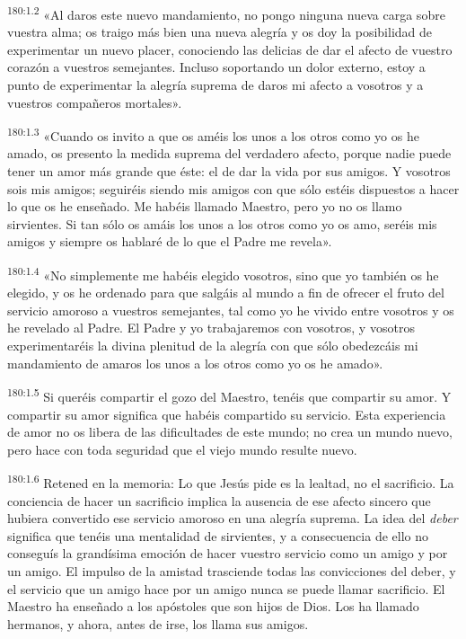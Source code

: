 \par 
\textsuperscript{180:1.2} «Al daros este nuevo mandamiento, no pongo ninguna nueva carga sobre vuestra alma; os traigo más bien una nueva alegría y os doy la posibilidad de experimentar un nuevo placer, conociendo las delicias de dar el afecto de vuestro corazón a vuestros semejantes. Incluso soportando un dolor externo, estoy a punto de experimentar la alegría suprema de daros mi afecto a vosotros y a vuestros compañeros mortales».

\par 
\textsuperscript{180:1.3} «Cuando os invito a que os améis los unos a los otros como yo os he amado, os presento la medida suprema del verdadero afecto, porque nadie puede tener un amor más grande que éste: el de dar la vida por sus amigos. Y vosotros sois mis amigos; seguiréis siendo mis amigos con que sólo estéis dispuestos a hacer lo que os he enseñado. Me habéis llamado Maestro, pero yo no os llamo sirvientes. Si tan sólo os amáis los unos a los otros como yo os amo, seréis mis amigos y siempre os hablaré de lo que el Padre me revela».

\par 
\textsuperscript{180:1.4} «No simplemente me habéis elegido vosotros, sino que yo también os he elegido, y os he ordenado para que salgáis al mundo a fin de ofrecer el fruto del servicio amoroso a vuestros semejantes, tal como yo he vivido entre vosotros y os he revelado al Padre. El Padre y yo trabajaremos con vosotros, y vosotros experimentaréis la divina plenitud de la alegría con que sólo obedezcáis mi mandamiento de amaros los unos a los otros como yo os he amado».

\par 
\textsuperscript{180:1.5} Si queréis compartir el gozo del Maestro, tenéis que compartir su amor. Y compartir su amor significa que habéis compartido su servicio. Esta experiencia de amor no os libera de las dificultades de este mundo; no crea un mundo nuevo, pero hace con toda seguridad que el viejo mundo resulte nuevo.

\par 
\textsuperscript{180:1.6} Retened en la memoria: Lo que Jesús pide es la lealtad, no el sacrificio. La conciencia de hacer un sacrificio implica la ausencia de ese afecto sincero que hubiera convertido ese servicio amoroso en una alegría suprema. La idea del \textit{deber} significa que tenéis una mentalidad de sirvientes, y a consecuencia de ello no conseguís la grandísima emoción de hacer vuestro servicio como un amigo y por un amigo. El impulso de la amistad trasciende todas las convicciones del deber, y el servicio que un amigo hace por un amigo nunca se puede llamar sacrificio. El Maestro ha enseñado a los apóstoles que son hijos de Dios. Los ha llamado hermanos, y ahora, antes de irse, los llama sus amigos.

